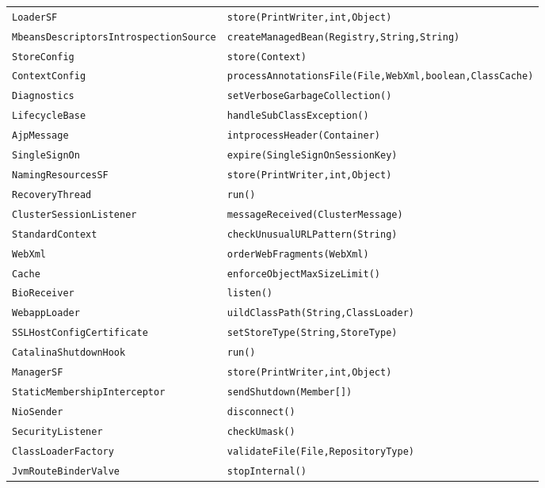 \begin{center}
\begin{longtable}{ll}
 \lstinline/LoaderSF/&{\lstinline/store(PrintWriter,int,Object)/}\\
 \lstinline/MbeansDescriptorsIntrospectionSource/&{\lstinline/createManagedBean(Registry,String,String)/}\\
 \lstinline/StoreConfig/&{\lstinline/store(Context)/}\\
 \lstinline/ContextConfig/&{\lstinline/processAnnotationsFile(File,WebXml,boolean,ClassCache)/}\\
 \lstinline/Diagnostics/&{\lstinline/setVerboseGarbageCollection()/}\\
 \lstinline/LifecycleBase/&{\lstinline/handleSubClassException()/}\\
 \lstinline/AjpMessage/&{\lstinline/intprocessHeader(Container)/}\\
 \lstinline/SingleSignOn/&{\lstinline/expire(SingleSignOnSessionKey)/}\\
 \lstinline/NamingResourcesSF/&{\lstinline/store(PrintWriter,int,Object)/}\\
 \lstinline/RecoveryThread/&{\lstinline/run()/}\\
 \lstinline/ClusterSessionListener/&{\lstinline/messageReceived(ClusterMessage)/}\\
\lstinline/StandardContext/&{\lstinline/checkUnusualURLPattern(String)/}\\
 \lstinline/WebXml/&{\lstinline/orderWebFragments(WebXml)/}\\
 \lstinline/Cache/&{\lstinline/enforceObjectMaxSizeLimit()/}\\
 \lstinline/BioReceiver/&{\lstinline/listen()/}\\
 \lstinline/WebappLoader/&{\lstinline/uildClassPath(String,ClassLoader)/}\\
 \lstinline/SSLHostConfigCertificate/&{\lstinline/setStoreType(String,StoreType)/}\\
 \lstinline/CatalinaShutdownHook/&{\lstinline/run()/}\\
 \lstinline/ManagerSF/&{\lstinline/store(PrintWriter,int,Object)/}\\
 \lstinline/StaticMembershipInterceptor/&{\lstinline/sendShutdown(Member[])/}\\
 \lstinline/NioSender/&{\lstinline/disconnect()/}\\
 \lstinline/SecurityListener/&{\lstinline/checkUmask()/}\\
 \lstinline/ClassLoaderFactory/&{\lstinline/validateFile(File,RepositoryType)/}\\
 \lstinline/JvmRouteBinderValve/&{\lstinline/stopInternal()/}\\

\end{longtable}
\end{center}
